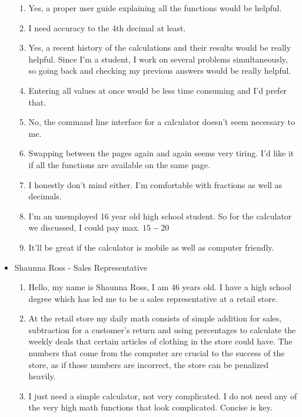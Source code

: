 \documentclass[titlepage]{article}
\begin{document}
\begin{itemize}
\begin{enumerate}
                            \item Yes, a proper user guide explaining all the functions would be helpful.
                            \item I need accuracy to the 4th decimal at least.
                            \item Yes, a recent history of the calculations and their results would be really helpful. Since I’m a student, I work on several problems simultaneously, so going back and checking my previous answers would be really helpful.
                            \item Entering all values at once would be less time consuming and I’d prefer that.
                            \item No, the command line interface for a calculator doesn’t seem necessary to me.
                            \item Swapping between the pages again and again seems very tiring. I’d like it if all the functions are available on the same page.
                            \item I honestly don’t mind either. I’m comfortable with fractions as well as decimals.
                            \item I’m an unemployed 16 year old high school student. So for the calculator we discussed, I could pay max. $15-$20
                            \item It’ll be great if the calculator is mobile as well as computer friendly.
                        \end{enumerate}
                    \item Shaunna Ross - Sales Representative
                        \begin{enumerate}
                            \item Hello, my name is Shaunna Ross, I am 46 years old. I have a high school degree which has led me to be a sales representative at a retail store.
                            \item At the retail store my daily math consists of simple addition for sales, subtraction for a customer’s return and using percentages to calculate the weekly deals that certain articles of clothing in the store could have. The numbers that come from the computer are crucial to the success of the store, as if those numbers are incorrect, the store can be penalized heavily.
                            \item I just need a simple calculator, not very complicated. I do not need any of the very high math functions that look complicated. Concise is key.

\end{enumerate}
\end{itemize}
\end{document}
